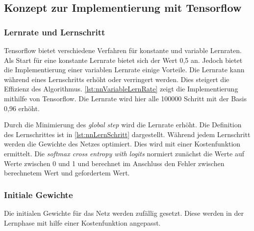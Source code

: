 \subsection{Konzept zur Implementierung mit Tensorflow}
\subsubsection{Lernrate und Lernschritt}
Tensorflow bietet verschiedene Verfahren für konstante und variable Lernraten. 
Als Start für eine konstante Lernrate bietet sich der Wert 0,5 an. Jedoch bietet 
die Implementierung einer variablen Lernrate einige Vorteile. Die Lernrate kann während 
eines Lernschritts erhöht oder verringert werden. Dies steigert die Effizienz des Algorithmus. 
\autoref{lst:nnVariableLernRate} zeigt die Implementierung mithilfe von Tensorflow. 
Die Lernrate wird hier alle 100000 Schritt mit der Basis 0,96 erhöht. 



Durch die Minimierung des \textit{global step} wird die Lernrate erhöht. 
Die Definition des Lernschrittes ist in \autoref{lst:nnLernSchritt} dargestellt.
Während jedem Lernschritt werden die Gewichte des Netzes optimiert.
Dies wird mit einer Kostenfunktion ermittelt. 
Die \textit{softmax cross entropy with logits} normiert zunächst die Werte auf Werte zwischen 0 und 1 und berechnet im 
Anschluss den Fehler zwischen berechnetem Wert und gefordertem Wert.



\subsubsection{Initiale Gewichte}
Die initialen Gewichte für das Netz werden zufällig gesetzt. Diese werden in der Lernphase 
mit hilfe einer Kostenfunktion angepasst.

